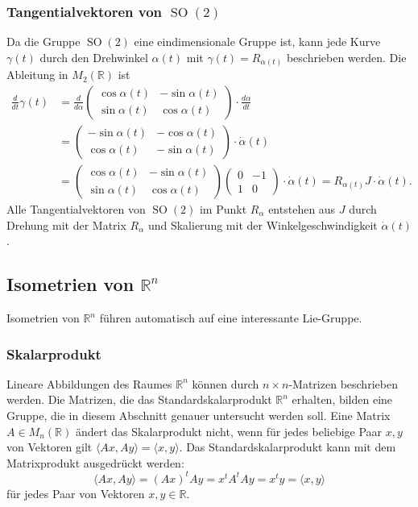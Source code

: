 \subsubsection{Tangentialvektoren von $\operatorname{SO}(2)$}
Da die Gruppe $\operatorname{SO}(2)$ eine eindimensionale Gruppe
ist, kann jede Kurve $\gamma(t)$ durch den Drehwinkel $\alpha(t)$
mit $\gamma(t) = R_{\alpha(t)}$ beschrieben werden.
Die Ableitung in $M_2(\mathbb{R})$ ist
\begin{align*}
\frac{d}{dt} \gamma(t)
&=
\frac{d}{d\alpha}
\begin{pmatrix}
\cos\alpha(t) & - \sin\alpha(t)\\
\sin\alpha(t) &   \cos\alpha(t)
\end{pmatrix}
\cdot
\frac{d\alpha}{dt}
\\
&=
\begin{pmatrix}
-\sin\alpha(t)&-\cos\alpha(t)\\
 \cos\alpha(t)&-\sin\alpha(t)
\end{pmatrix}
\cdot
\dot{\alpha}(t)
\\
&=
\begin{pmatrix}
\cos\alpha(t) & - \sin\alpha(t)\\
\sin\alpha(t) &   \cos\alpha(t)
\end{pmatrix}
\begin{pmatrix}
0&-1\\
1&0
\end{pmatrix}
\cdot
\dot{\alpha}(t)
=
R_{\alpha(t)}J\cdot\dot{\alpha}(t).
\end{align*}
Alle Tangentialvektoren von $\operatorname{SO}(2)$ im Punkt $R_\alpha$
entstehen aus $J$ durch Drehung mit der Matrix $R_\alpha$ und Skalierung
mit der Winkelgeschwindigkeit $\dot{\alpha}(t)$.
%

%
%
\subsection{Isometrien von $\mathbb{R}^n$
\label{buch:gruppen:isometrien}}
Isometrien von $\mathbb{R}^n$ führen automatisch auf eine interessante
Lie-Gruppe.

\subsubsection{Skalarprodukt}
Lineare Abbildungen des Raumes $\mathbb{R}^n$ können durch
$n\times n$-Matrizen beschrieben werden.
Die Matrizen, die das Standardskalarprodukt $\mathbb{R}^n$ erhalten,
bilden eine Gruppe, die in diesem Abschnitt genauer untersucht werden soll.
Eine Matrix $A\in M_{n}(\mathbb{R})$ ändert das Skalarprodukt nicht, wenn
für jedes beliebige Paar $x,y$ von Vektoren gilt
$\langle Ax,Ay\rangle = \langle x,y\rangle$.
Das Standardskalarprodukt kann mit dem Matrixprodukt ausgedrückt werden:
\[
\langle Ax,Ay\rangle
=
(Ax)^tAy
=
x^tA^tAy
=
x^ty
=
\langle x,y\rangle
\]
für jedes Paar von Vektoren $x,y\in\mathbb{R}$.

